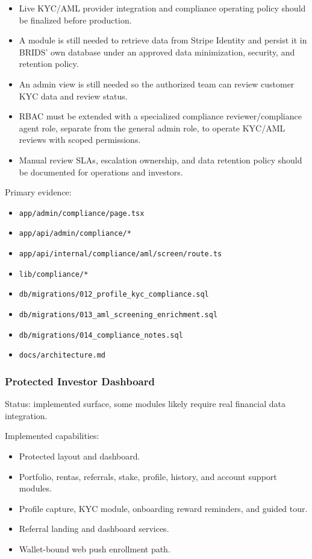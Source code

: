 \documentclass[
  10pt,
  letterpaper,
]{article}
\providecommand{\tightlist}{%
  \setlength{\itemsep}{0pt}\setlength{\parskip}{0pt}}
\let\oldtexttt\texttt
\renewcommand{\texttt}[1]{\oldtexttt{\small #1}}
\begin{document}
\begin{itemize}
\tightlist
\item
  Live KYC/AML provider integration and compliance operating policy
  should be finalized before production.
\item
  A module is still needed to retrieve data from Stripe Identity and
  persist it in BRIDS' own database under an approved data minimization,
  security, and retention policy.
\item
  An admin view is still needed so the authorized team can review
  customer KYC data and review status.
\item
  RBAC must be extended with a specialized compliance
  reviewer/compliance agent role, separate from the general admin role,
  to operate KYC/AML reviews with scoped permissions.
\item
  Manual review SLAs, escalation ownership, and data retention policy
  should be documented for operations and investors.
\end{itemize}

Primary evidence:

\begin{itemize}
\tightlist
\item
  \texttt{app/admin/compliance/page.tsx}
\item
  \texttt{app/api/admin/compliance/*}
\item
  \texttt{app/api/internal/compliance/aml/screen/route.ts}
\item
  \texttt{lib/compliance/*}
\item
  \texttt{db/migrations/012\_profile\_kyc\_compliance.sql}
\item
  \texttt{db/migrations/013\_aml\_screening\_enrichment.sql}
\item
  \texttt{db/migrations/014\_compliance\_notes.sql}
\item
  \texttt{docs/architecture.md}
\end{itemize}

\subsubsection{Protected Investor
Dashboard}\label{protected-investor-dashboard}

Status: implemented surface, some modules likely require real financial
data integration.

Implemented capabilities:

\begin{itemize}
\tightlist
\item
  Protected layout and dashboard.
\item
  Portfolio, rentas, referrals, stake, profile, history, and account
  support modules.
\item
  Profile capture, KYC module, onboarding reward reminders, and guided
  tour.
\item
  Referral landing and dashboard services.
\item
  Wallet-bound web push enrollment path.
\end{itemize}
\end{document}
